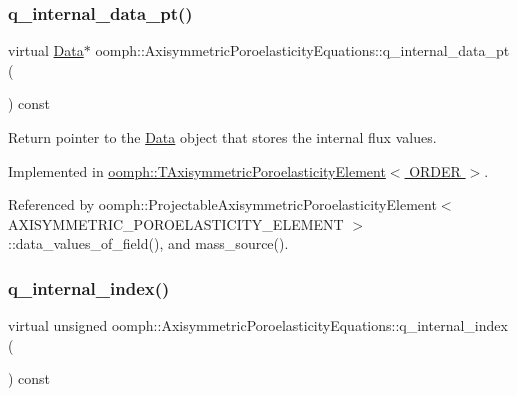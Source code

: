 \subsubsection{\texorpdfstring{q\+\_\+internal\+\_\+data\+\_\+pt()}{q\_internal\_data\_pt()}}
{\footnotesize\ttfamily virtual \hyperlink{classoomph_1_1Data}{Data}$\ast$ oomph\+::\+Axisymmetric\+Poroelasticity\+Equations\+::q\+\_\+internal\+\_\+data\+\_\+pt (\begin{DoxyParamCaption}{ }\end{DoxyParamCaption}) const\hspace{0.3cm}{\ttfamily [pure virtual]}}



Return pointer to the \hyperlink{classoomph_1_1Data}{Data} object that stores the internal flux values. 



Implemented in \hyperlink{classoomph_1_1TAxisymmetricPoroelasticityElement_a294374f01ed46c7ea77553234bb37c88}{oomph\+::\+T\+Axisymmetric\+Poroelasticity\+Element$<$ O\+R\+D\+E\+R $>$}.



Referenced by oomph\+::\+Projectable\+Axisymmetric\+Poroelasticity\+Element$<$ A\+X\+I\+S\+Y\+M\+M\+E\+T\+R\+I\+C\+\_\+\+P\+O\+R\+O\+E\+L\+A\+S\+T\+I\+C\+I\+T\+Y\+\_\+\+E\+L\+E\+M\+E\+N\+T $>$\+::data\+\_\+values\+\_\+of\+\_\+field(), and mass\+\_\+source().

\mbox{\label{classoomph_1_1AxisymmetricPoroelasticityEquations_a0c4a88ea26b89ce26aac6a04c21496dd}} 
\subsubsection{\texorpdfstring{q\+\_\+internal\+\_\+index()}{q\_internal\_index()}}
{\footnotesize\ttfamily virtual unsigned oomph\+::\+Axisymmetric\+Poroelasticity\+Equations\+::q\+\_\+internal\+\_\+index (\begin{DoxyParamCaption}{ }\end{DoxyParamCaption}) const\hspace{0.3cm}{\ttfamily [pure virtual]}}



